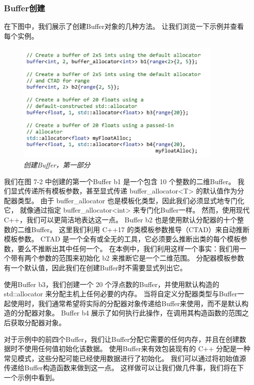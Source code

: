 \subsubsection{Buffer创建}
在下图中，我们展示了创建Buffer对象的几种方法。 让我们浏览一下示例并查看每个实例。

\begin{figure}[H]
	\centering
	\includegraphics[width=0.9\textwidth]{figs/F7.2.png}
	\caption{\textit{创建Buffer，第一部分 }}
\end{figure}

我们在图 7-2 中创建的第一个Buffer b1 是一个包含 10 个整数的二维Buffer。 
我们显式传递所有模板参数，甚至显式传递 buffer\_allocator<T> 的默认值作为分配器类型。 
由于 buffer\_allocator 也是模板化类型，因此我们必须显式地专门化它，
就像通过指定 buffer\_allocator<int> 来专门化Buffer一样。 然而，使用现代 C++，我们可以更简洁地表达这一点。 
Buffer b2 也是使用默认分配器的十个整数的二维Buffer。 
这里我们利用 C++17 的类模板参数推导（CTAD）来自动推断模板参数。 
CTAD 是一个全有或全无的工具，它必须要么推断出类的每个模板参数，要么不推断出其中任何一个。 
在本例中，我们利用这样一个事实：我们用一个带有两个参数的范围来初始化 b2 来推断它是一个二维范围。 
分配器模板参数有一个默认值，因此我们在创建Buffer时不需要显式列出它。

使用Buffer b3，我们创建一个 20 个浮点数的Buffer，并使用默认构造的 std::allocator 来分配主机上任何必要的内存。 
当将自定义分配器类型与Buffer一起使用时，我们通常希望将实际的分配器对象传递给Buffer来使用，而不是默认构造的分配器对象。 
Buffer b4 展示了如何执行此操作，在调用其构造函数的范围之后获取分配器对象。

对于示例中的前四个Buffer，我们让Buffer分配它需要的任何内存，并且在创建数据时不使用任何值初始化该数据。 
使用Buffer来有效包装现有的 C++ 分配是一种常见模式，这些分配可能已经使用数据进行了初始化。 
我们可以通过将初始值源传递给Buffer构造函数来做到这一点。 这样做可以让我们做几件事，我们将在下一个示例中看到。

